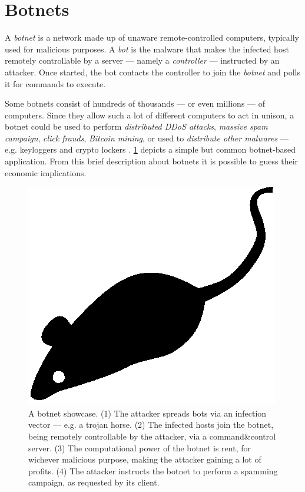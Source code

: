 \section{Botnets}
\label{sec:botnets}

A \textit{botnet} is a network made up of unaware remote-controlled computers, typically used for malicious purposes.
A \textit{bot} is the malware that makes the infected host remotely controllable by a server — namely a \textit{controller} — instructed by an attacker. Once started, the bot contacts the controller to join the \textit{botnet} and polls it for commands to execute.

Some botnets consist of hundreds of thousands — or even millions — of computers. Since they allow such a lot of different computers to act in unison, a botnet could be used to perform \textit{distributed DDoS attacks}, \textit{massive spam campaign}, \textit{click frauds}, \textit{Bitcoin mining}, or used to \textit{distribute other malwares} — e.g. keyloggers and crypto lockers \cite{anderson2008security}. \ref{fig:botnet-showcase} depicts a simple but common botnet-based application. From this brief description about botnets it is possible to guess their economic implications.

\begin{figure}[tp]
  \centering
  \includegraphics{./fig/acmlarge-mouse}
  \caption{A botnet showcase. (1) The attacker spreads bots via an infection vector — e.g. a trojan horse. (2) The infected hosts join the botnet, being remotely controllable by the attacker, via a command\&control server. (3) The computational power of the botnet is rent, for wichever malicious purpose, making the attacker gaining a lot of profits. (4) The attacker instructs the botnet to perform a spamming campaign, as requested by its client.}
    \label{fig:botnet-showcase}
\end{figure}


